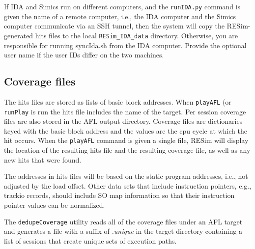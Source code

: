 \documentclass[titlepage]{article}
\begin{document}
If IDA and Simics run on different computers, and the {\tt runIDA.py} command is given the name of a remote 
computer, i.e., the IDA computer and the Simics computer communicate via an SSH tunnel, 
then the system will copy the RESim-generated hits files to the local {\tt RESim\_IDA\_data} directory.  
Otherwise, you are responsible for running syncIda.sh from the IDA computer.  Provide the optional user name
if the user IDs differ on the two machines.


\subsection{Coverage files}
The hits files are stored as lists of basic block addresses.  When {\tt playAFL} (or {\tt runPlay} is run the hits
file includes the name of the target.  Per session coverage files are also stored in the AFL output
directory.  Coverage files are dictionaries keyed with the basic block address and the values are the
cpu cycle at which the hit occurs.  When the {\tt playAFL} command is given a single file, RESim will
display the location of the resulting hits file and the resulting coverage file, as well as any new
hits that were found.

The addresses in hits files will be based on the static program addresses, i.e., not adjusted
by the load offset.  Other data sets that include instruction pointers, e.g., trackio records, 
should include SO map information so that their instruction pointer values can be normalized.

The {\tt dedupeCoverage} utility reads all of the coverage files under an AFL target and generates
a file with a suffix of \textit{.unique} in the target directory containing a list of sessions that
create unique sets of execution paths.
\end{document}

